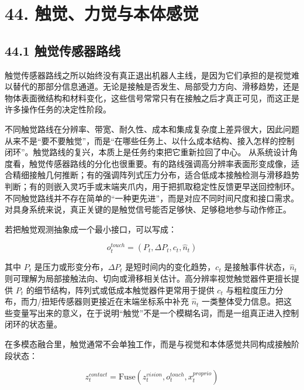 \section*{44. 触觉、力觉与本体感觉}

\subsection*{44.1 触觉传感器路线}


触觉传感器路线之所以始终没有真正退出机器人主线，是因为它们承担的是视觉难以替代的那部分信息通道。无论是接触是否发生、局部受力方向、滑移趋势，还是物体表面微结构和材料变化，这些信号常常只有在接触之后才真正可见，而这正是许多操作任务的决定性阶段。

不同触觉路线在分辨率、带宽、耐久性、成本和集成复杂度上差异很大，因此问题从来不是“要不要触觉”，而是“在哪些任务上、以什么成本结构、接入怎样的控制闭环”。触觉路线的复兴，本质上是任务约束把它重新拉回了中心。 从系统设计角度看，触觉传感器路线的分化也很重要。有的路线强调高分辨率表面形变成像，适合精细接触几何推断；有的强调阵列式压力分布，适合低成本接触检测与滑移趋势判断；有的则嵌入灵巧手或末端夹爪内，用于把抓取稳定性反馈更早送回控制环。不同触觉路线并不存在简单的“一种更先进”，而是对应不同时间尺度和接口需求。对具身系统来说，真正关键的是触觉信号能否足够快、足够稳地参与动作修正。

若把触觉观测抽象成一个最小接口，可以写成：

\begin{equation*}
o_t^{touch} = (P_t, \Delta P_t, c_t, \hat{n}_t)
\end{equation*}

其中 \(P_t\) 是压力或形变分布，\(\Delta P_t\) 是短时间内的变化趋势，\(c_t\) 是接触事件状态，\(\hat{n}_t\) 则可理解为局部接触法向、切向或滑移相关估计。高分辨率视觉触觉器件更擅长提供 \(P_t\) 的细节结构，阵列式或低成本触觉器件更常用于提供 \(c_t\) 与粗粒度压力分布，而力/扭矩传感器则更接近在末端坐标系中补充 \(\hat{n}_t\) 一类整体受力信息。把这些变量写出来的意义，在于说明“触觉”不是一个模糊名词，而是一组真正进入控制闭环的状态量。

在多模态融合里，触觉通常不会单独工作，而是与视觉和本体感觉共同构成接触阶段状态：

\begingroup
\footnotesize
\begin{equation*}
z_t^{contact} = \mathrm{Fuse}(z_t^{vision}, o_t^{touch}, x_t^{proprio})
\end{equation*}
\endgroup

